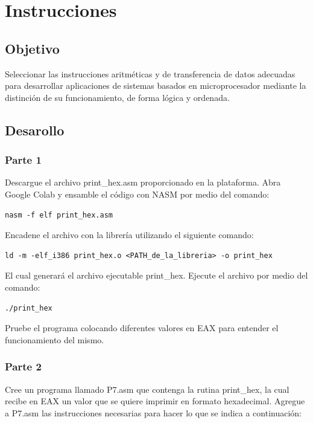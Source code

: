 \documentclass[12pt]{article}
\begin{document}
\section*{Instrucciones}
\label{sec:org66e33e7}
\subsection*{Objetivo}
\label{sec:org566b8cd}
Seleccionar las instrucciones aritméticas y de transferencia de datos
adecuadas para desarrollar aplicaciones de sistemas basados en
microprocesador mediante la distinción de su funcionamiento, de forma
lógica y ordenada.

\subsection*{Desarollo}
\label{sec:org925951a}
\subsubsection*{Parte 1}
\label{sec:org303170a}
Descargue el archivo print\_hex.asm proporcionado en la plataforma. Abra Google Colab y ensamble el código con NASM por medio del comando:

\begin{verbatim}
nasm -f elf print_hex.asm
\end{verbatim}

Encadene el archivo con la librería utilizando el siguiente comando:

\begin{verbatim}
ld -m -elf_i386 print_hex.o <PATH_de_la_libreria> -o print_hex
\end{verbatim}

El cual generará el archivo ejecutable print\_hex. Ejecute el archivo por medio del comando:

\begin{verbatim}
./print_hex
\end{verbatim}

Pruebe el programa colocando diferentes valores en EAX para entender el funcionamiento del mismo.

\subsubsection*{Parte 2}
\label{sec:orgf6b4fb5}
Cree un programa llamado P7.asm que contenga la rutina print\_hex, la cual recibe en EAX un valor que se quiere imprimir en formato hexadecimal. Agregue a P7.asm las instrucciones necesarias para hacer lo que se indica a continuación:
\end{document}
